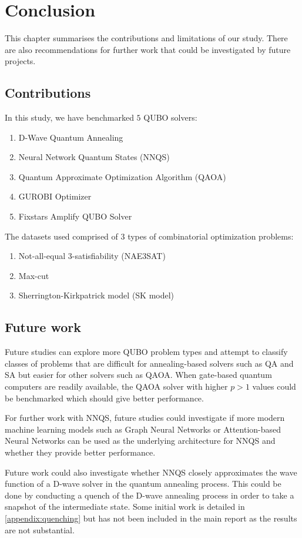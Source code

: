 \chapter{Conclusion}

This chapter summarises the contributions and limitations of our study. There are also recommendations for further work that could be investigated by future projects.

\section{Contributions}
In this study, we have benchmarked $5$ QUBO solvers:
\begin{enumerate}
    \item D-Wave Quantum Annealing
    \item Neural Network Quantum States (NNQS)
    \item Quantum Approximate Optimization Algorithm (QAOA)
    \item GUROBI Optimizer
    \item Fixstars Amplify QUBO Solver
\end{enumerate}
The datasets used comprised of $3$ types of combinatorial optimization problems:
\begin{enumerate}
    \item Not-all-equal 3-satisfiability (NAE3SAT)
    \item Max-cut
    \item Sherrington-Kirkpatrick model (SK model)
\end{enumerate}

\section{Future work}
Future studies can explore more QUBO problem types and attempt to classify classes of problems that are difficult for annealing-based solvers such as QA and SA but easier for other solvers such as QAOA. When gate-based quantum computers are readily available, the QAOA solver with higher $p > 1$ values could be benchmarked which should give better performance.

For further work with NNQS, future studies could investigate if more modern machine learning models such as Graph Neural Networks or Attention-based Neural Networks can be used as the underlying architecture for NNQS and whether they provide better performance.

Future work could also investigate whether NNQS closely approximates the wave function of a D-wave solver in the quantum annealing process. This could be done by conducting a quench of the D-wave annealing process in order to take a snapshot of the intermediate state. Some initial work is detailed in \autoref{appendix:quenching} but has not been included in the main report as the results are not substantial.
